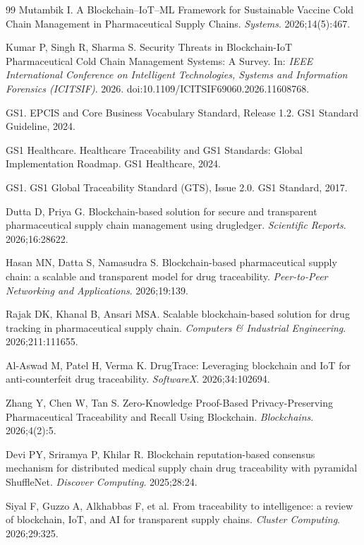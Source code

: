 \documentclass[pdflatex,sn-mathphys-num]{sn-jnl}
\theoremstyle{thmstyleone}
\theoremstyle{thmstyletwo}
\theoremstyle{thmstylethree}
\begin{document}
\begin{thebibliography}{99}
Mutambik I. A Blockchain--IoT--ML Framework for Sustainable Vaccine Cold Chain Management in Pharmaceutical Supply Chains. \textit{Systems}. 2026;14(5):467.

Kumar P, Singh R, Sharma S. Security Threats in Blockchain-IoT Pharmaceutical Cold Chain Management Systems: A Survey. In: \textit{IEEE International Conference on Intelligent Technologies, Systems and Information Forensics (ICITSIF)}. 2026. doi:10.1109/ICITSIF69060.2026.11608768.

GS1. EPCIS and Core Business Vocabulary Standard, Release 1.2. GS1 Standard Guideline, 2024.

GS1 Healthcare. Healthcare Traceability and GS1 Standards: Global Implementation Roadmap. GS1 Healthcare, 2024.

GS1. GS1 Global Traceability Standard (GTS), Issue 2.0. GS1 Standard, 2017.

Dutta D, Priya G. Blockchain-based solution for secure and transparent pharmaceutical supply chain management using drugledger. \textit{Scientific Reports}. 2026;16:28622.

Hasan MN, Datta S, Namasudra S. Blockchain-based pharmaceutical supply chain: a scalable and transparent model for drug traceability. \textit{Peer-to-Peer Networking and Applications}. 2026;19:139.

Rajak DK, Khanal B, Ansari MSA. Scalable blockchain-based solution for drug tracking in pharmaceutical supply chain. \textit{Computers \& Industrial Engineering}. 2026;211:111655.

Al-Aswad M, Patel H, Verma K. DrugTrace: Leveraging blockchain and IoT for anti-counterfeit drug traceability. \textit{SoftwareX}. 2026;34:102694.

Zhang Y, Chen W, Tan S. Zero-Knowledge Proof-Based Privacy-Preserving Pharmaceutical Traceability and Recall Using Blockchain. \textit{Blockchains}. 2026;4(2):5.

Devi PY, Sriramya P, Khilar R. Blockchain reputation-based consensus mechanism for distributed medical supply chain drug traceability with pyramidal ShuffleNet. \textit{Discover Computing}. 2025;28:24.

Siyal F, Guzzo A, Alkhabbas F, et al. From traceability to intelligence: a review of blockchain, IoT, and AI for transparent supply chains. \textit{Cluster Computing}. 2026;29:325.

\end{thebibliography}
\end{document}
